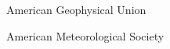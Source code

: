 \documentclass[11pt, letterpaper]{article} %
\begin{document}
  American Geophysical Union

  American Meteorological Society







\end{document}
